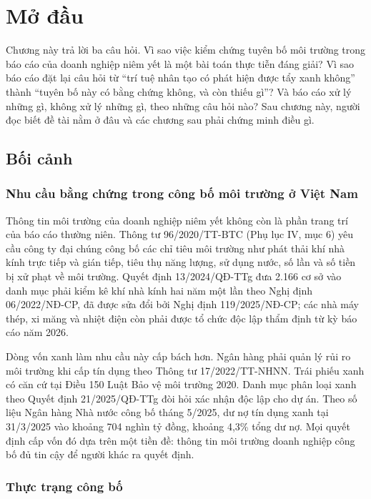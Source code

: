 \chapter{Mở đầu}\label{ch:mo-dau}

Chương này trả lời ba câu hỏi. Vì sao việc kiểm chứng tuyên bố môi trường trong báo cáo của doanh nghiệp niêm yết là một bài toán thực tiễn đáng giải? Vì sao báo cáo đặt lại câu hỏi từ “trí tuệ nhân tạo có phát hiện được tẩy xanh không” thành “tuyên bố này có bằng chứng không, và còn thiếu gì”? Và báo cáo xử lý những gì, không xử lý những gì, theo những câu hỏi nào? Sau chương này, người đọc biết đề tài nằm ở đâu và các chương sau phải chứng minh điều gì.

\section{Bối cảnh}

\subsection{Nhu cầu bằng chứng trong công bố môi trường ở Việt Nam}

Thông tin môi trường của doanh nghiệp niêm yết không còn là phần trang trí của báo cáo thường niên. Thông tư 96/2020/TT-BTC (Phụ lục IV, mục 6) yêu cầu công ty đại chúng công bố các chỉ tiêu môi trường như phát thải khí nhà kính trực tiếp và gián tiếp, tiêu thụ năng lượng, sử dụng nước, số lần và số tiền bị xử phạt về môi trường. Quyết định 13/2024/QĐ-TTg đưa 2.166 cơ sở vào danh mục phải kiểm kê khí nhà kính hai năm một lần theo Nghị định 06/2022/NĐ-CP, đã được sửa đổi bởi Nghị định 119/2025/NĐ-CP; các nhà máy thép, xi măng và nhiệt điện còn phải được tổ chức độc lập thẩm định từ kỳ báo cáo năm 2026.

Dòng vốn xanh làm nhu cầu này cấp bách hơn. Ngân hàng phải quản lý rủi ro môi trường khi cấp tín dụng theo Thông tư 17/2022/TT-NHNN. Trái phiếu xanh có căn cứ tại Điều 150 Luật Bảo vệ môi trường 2020. Danh mục phân loại xanh theo Quyết định 21/2025/QĐ-TTg đòi hỏi xác nhận độc lập cho dự án. Theo số liệu Ngân hàng Nhà nước công bố tháng 5/2025, dư nợ tín dụng xanh tại 31/3/2025 vào khoảng 704 nghìn tỷ đồng, khoảng 4,3\% tổng dư nợ. Mọi quyết định cấp vốn đó dựa trên một tiền đề: thông tin môi trường doanh nghiệp công bố đủ tin cậy để người khác ra quyết định.

\subsection{Thực trạng công bố}

